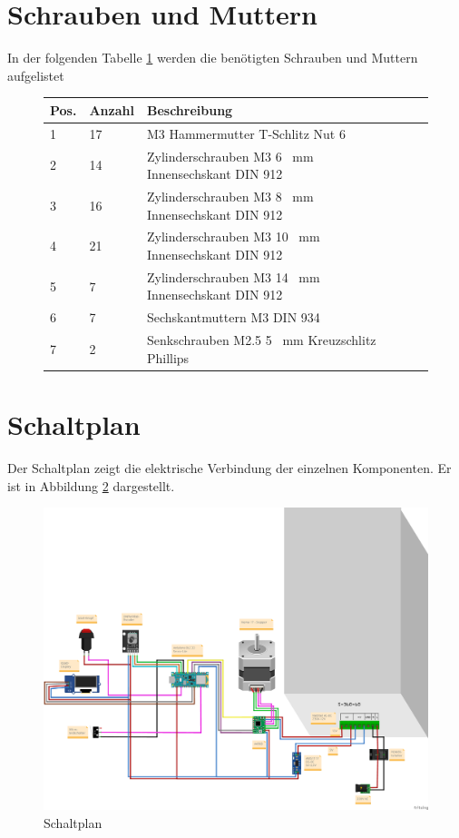 \section{Schrauben und Muttern }
In der folgenden Tabelle \ref{Verbrauch} werden die benötigten Schrauben und Muttern aufgelistet

\begin{figure}[H]
	\begin{center}
		\fontsize{8}{10}\selectfont
		\begin{tabularx}{\textwidth}{|p{0.5cm}|p{}|X|X|X|X|} 
			\hline 
			\textbf{Pos.} &  \textbf{Anzahl} &  \textbf{Beschreibung}\\ \hline
			1 & 17 & M3 Hammermutter T-Schlitz Nut 6  \\ \hline
			2 & 14 & Zylinderschrauben M3 6 \ mm Innensechskant DIN 912  \\ \hline
			3 & 16 & Zylinderschrauben M3 8 \ mm Innensechskant DIN 912 \\ \hline
			4 & 21 & Zylinderschrauben M3 10 \ mm Innensechskant DIN 912\\ \hline
			5 & 7  & Zylinderschrauben M3 14 \ mm Innensechskant DIN 912 \\ \hline
			6 & 7 & Sechskantmuttern M3 DIN 934  \\ \hline
			7 & 2 &  Senkschrauben M2.5 5 \ mm Kreuzschlitz Phillips  \\ \hline
			
		\end{tabularx}
			\label{Verbrauch}
	\end{center}
\end{figure}

\section{Schaltplan}
Der Schaltplan zeigt die elektrische Verbindung der einzelnen Komponenten. Er ist in Abbildung \ref{Splan} dargestellt.

\begin{figure}[H]
	\begin{center}
		\includegraphics[width=\textwidth]{Images/Schaltplan1.png}
		\caption{Schaltplan} \label{Splan}
	\end{center}
\end{figure}

 